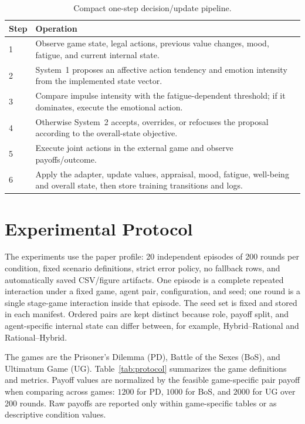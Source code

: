 \documentclass[runningheads]{llncs}
\begin{document}
\begin{table}[t]
\centering
\caption{Compact one-step decision/update pipeline.}
\label{tab:pipeline}
\scriptsize
\begin{tabular}{p{.07\linewidth}p{.84\linewidth}}
\toprule
Step & Operation \\
\midrule
1 & Observe game state, legal actions, previous value changes, mood, fatigue, and current internal state. \\
2 & System~1 proposes an affective action tendency and emotion intensity from the implemented state vector. \\
3 & Compare impulse intensity with the fatigue-dependent threshold; if it dominates, execute the emotional action. \\
4 & Otherwise System~2 accepts, overrides, or refocuses the proposal according to the overall-state objective. \\
5 & Execute joint actions in the external game and observe payoffs/outcome. \\
6 & Apply the adapter, update values, appraisal, mood, fatigue, well-being and overall state, then store training transitions and logs. \\
\bottomrule
\end{tabular}
\end{table}

\section{Experimental Protocol}
\label{sec:protocol}
The experiments use the paper profile: 20 independent episodes of 200 rounds per condition, fixed scenario definitions, strict error policy, no fallback rows, and automatically saved CSV/figure artifacts. One episode is a complete repeated interaction under a fixed game, agent pair, configuration, and seed; one round is a single stage-game interaction inside that episode. The seed set is fixed and stored in each manifest. Ordered pairs are kept distinct because role, payoff split, and agent-specific internal state can differ between, for example, Hybrid--Rational and Rational--Hybrid.

The games are the Prisoner's Dilemma (PD), Battle of the Sexes (BoS), and Ultimatum Game (UG). Table~\ref{tab:protocol} summarizes the game definitions and metrics. Payoff values are normalized by the feasible game-specific pair payoff when comparing across games: $1200$ for PD, $1000$ for BoS, and $2000$ for UG over 200 rounds. Raw payoffs are reported only within game-specific tables or as descriptive condition values.
\end{document}
